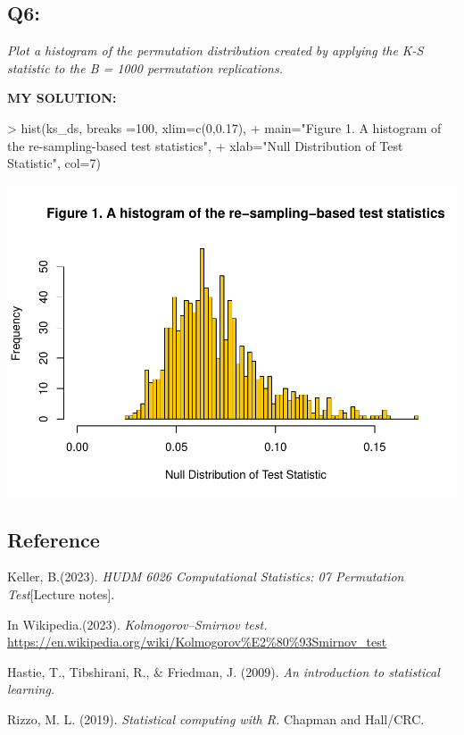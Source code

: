 \documentclass[
]{article}
\newenvironment{Shaded}{\begin{snugshade}}{\end{snugshade}}
\newcommand{\AttributeTok}[1]{\textcolor[rgb]{0.77,0.63,0.00}{#1}}
\newcommand{\DecValTok}[1]{\textcolor[rgb]{0.00,0.00,0.81}{#1}}
\newcommand{\FloatTok}[1]{\textcolor[rgb]{0.00,0.00,0.81}{#1}}
\newcommand{\FunctionTok}[1]{\textcolor[rgb]{0.00,0.00,0.00}{#1}}
\newcommand{\NormalTok}[1]{#1}
\newcommand{\SpecialCharTok}[1]{\textcolor[rgb]{0.00,0.00,0.00}{#1}}
\newcommand{\StringTok}[1]{\textcolor[rgb]{0.31,0.60,0.02}{#1}}
\begin{document}
\hypertarget{q6}{%
\subsection{Q6:}\label{q6}}

\emph{Plot a histogram of the permutation distribution created by
applying the K-S statistic to the B = 1000 permutation replications.}

\textbf{MY SOLUTION:}

\begin{Shaded}
\begin{Highlighting}[]
\SpecialCharTok{\textgreater{}} \FunctionTok{hist}\NormalTok{(ks\_ds, }\AttributeTok{breaks =}\DecValTok{100}\NormalTok{, }\AttributeTok{xlim=}\FunctionTok{c}\NormalTok{(}\DecValTok{0}\NormalTok{,}\FloatTok{0.17}\NormalTok{), }
\SpecialCharTok{+}      \AttributeTok{main=}\StringTok{"Figure 1. A histogram of the re{-}sampling{-}based test statistics"}\NormalTok{,}
\SpecialCharTok{+}      \AttributeTok{xlab=}\StringTok{"Null Distribution of Test Statistic"}\NormalTok{, }\AttributeTok{col=}\DecValTok{7}\NormalTok{)}
\end{Highlighting}
\end{Shaded}

\includegraphics{Homework_07_Pan_files/figure-latex/unnamed-chunk-6-1.pdf}

\hypertarget{reference}{%
\subsection{Reference}\label{reference}}

Keller, B.(2023). \emph{HUDM 6026 Computational Statistics: 07
Permutation Test}{[}Lecture notes{]}.

In Wikipedia.(2023). \emph{Kolmogorov--Smirnov test.}
\url{https://en.wikipedia.org/wiki/Kolmogorov\%E2\%80\%93Smirnov_test}

Hastie, T., Tibshirani, R., \& Friedman, J. (2009). \emph{An
introduction to statistical learning.}

Rizzo, M. L. (2019). \emph{Statistical computing with R.} Chapman and
Hall/CRC.
\end{document}
